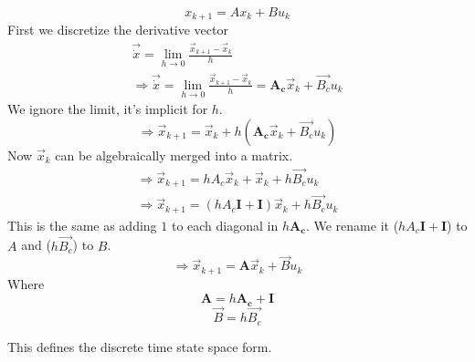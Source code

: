 \begin{equation}
	x_{k+1} = Ax_k + Bu_k
\end{equation}
First we discretize the derivative vector
\begin{subequations}
\begin{align}
\vec{\dot{x}} = \lim_{h\rightarrow 0} \frac{\vec{x}_{k+1}-\vec{x}_{k}}{h} \\
\Rightarrow \vec{\dot{x}} = \lim_{h\rightarrow 0} \frac{\vec{x}_{k+1}-\vec{x}_{k}}{h} = \mathbf{A_c} \vec{x}_k + \vec{B_c} u_k
\end{align}
\end{subequations}
We ignore the limit, it's implicit for $ h $.
\begin{equation}
\Rightarrow \vec{x}_{k+1} = \vec{x}_{k} + h(\mathbf{A_c} \vec{x}_k + \vec{B_c} u_k)
\end{equation}
Now $ \vec{x}_k $ can be algebraically merged into a matrix.
\begin{subequations}
\begin{align}
\Rightarrow \vec{x}_{k+1} = h{A_c} \vec{x}_k + \vec{x}_{k} + h\vec{B_c} u_k \\
\Rightarrow \vec{x}_{k+1} = (h{A_c} \mathbf{I} + \mathbf{I})\vec{x}_k + h\vec{B_c} u_k
\end{align}
\end{subequations}
This is the same as adding $ 1 $ to each diagonal in $ h\mathbf{A_c} $. We rename it ($hA_c\mathbf{I} + \mathbf{I}$) to $ {A}$ and ($h\vec{B_c}$) to $B$.
\begin{equation} \label{mat:eq}
\Rightarrow \vec{x}_{k+1} = \mathbf{A} \vec{x}_k + \vec{B} u_k
\end{equation}
Where
\begin{equation}
\mathbf{A} = h\mathbf{A_c} + \mathbf{I}
\end{equation}
\begin{equation}
\vec{B} = h\vec{B_c}
\end{equation}

This defines the discrete time state space form.


